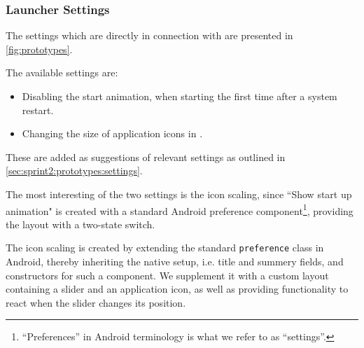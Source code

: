 \subsubsection{Launcher Settings}
The settings which are directly in connection with \launcher are presented in \cref{fig:prototypes}.

The available settings are:
\begin{itemize}
 	\item Disabling the start animation, when starting \launcher the first time after a system restart.
 	\item Changing the size of application icons in  \homeactivity.
\end{itemize} 

These are added as suggestions of relevant \launcher settings as outlined in \cref{sec:sprint2:prototypes:settings}.

The most interesting of the two settings is the icon scaling, since ``Show start up animation" is created with a standard Android preference component\footnote{``Preferences'' in Android terminology is what we refer to as ``settings''.}, providing the layout with a two-state switch.

The icon scaling is created by extending the standard \lstinline|preference| class in Android, thereby inheriting the native setup, i.e. title and summery fields, and constructors for such a component.
We supplement it with a custom layout containing a slider and an application icon, as well as providing functionality to react when the slider changes its position.